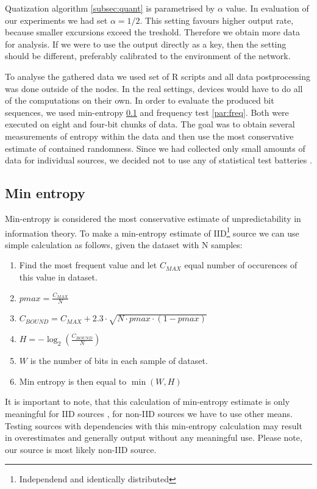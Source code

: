 \documentclass[
  print, %
  Table,   %
  nolof,     %
  nolot,     %
           oneside
]{fithesis3}
\begin{document}
  Quatization algorithm \ref{subsec:quant} is parametrised by $\alpha$ value. In evaluation of our experiments we had set $\alpha = 1/2$. This setting favours higher output rate, because smaller excursions exceed the treshold. Therefore we obtain more data for analysis. If we were to use the output directly as a key, then the setting should be different, preferably calibrated to the environment of the network.

  To analyse the gathered data we used set of R scripts and all data postprocessing was done outside of the nodes. In the real settings, devices would have to do all of the computations on their own. In order to evaluate the produced bit sequences, we used min-entropy \ref{par:min} and frequency test \ref{par:freq}. Both were executed on eight and four-bit chunks of data. The goal was to obtain several measurements of entropy within the data and then use the most conservative estimate of contained randomness. Since we had collected only small amounts of data for individual sources, we decided not to use any of statistical test batteries \cite{rukhin2001statistical}.


  \subsection{Min entropy}\label{par:min}
Min-entropy \cite{barker2012recommendation} is considered the most conservative estimate of unpredictability in information theory. To make a min-entropy estimate of IID\footnote{Independend and identically distributed} source we can use simple calculation as follows, given the dataset with N samples:


\begin{enumerate}
  \item Find the most frequent value and let $C_{MAX}$ equal number of occurences of this value in dataset.
  \item $pmax = \frac{C_{MAX}}{N}$
  \item $C_{BOUND}=C_{MAX} + 2.3 \cdot \sqrt{N \cdot pmax \cdot ( 1- pmax)}$
  \item $H = - \log_2 (\frac{C_{BOUND}}{N}) $
  \item $W$ is the number of bits in each sample of dataset.
  \item Min entropy is then equal to $\min(W, H)$

\end{enumerate}

It is important to note, that this calculation of min-entropy estimate is only meaningful for IID sources \cite{barker2012recommendation}, for non-IID sources we have to use other means. Testing sources with dependencies with this min-entropy calculation may result in overestimates and generally output without any meaningful use. Please note, our source is most likely non-IID source.
\end{document}
